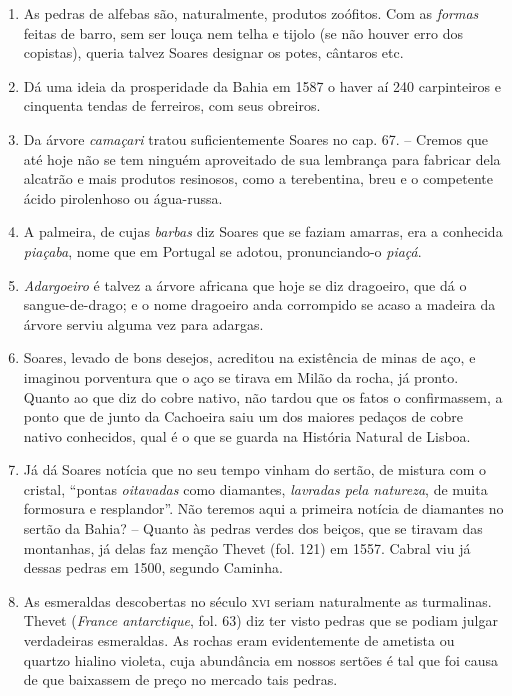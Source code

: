 \begin{enumerate}
\item As pedras de alfebas são, naturalmente, produtos zoófitos. Com as \textit{formas} 
feitas de barro, sem ser louça nem telha e tijolo (se não houver erro dos copistas), queria 
talvez Soares designar os potes, cântaros etc.

\item Dá uma ideia da prosperidade da Bahia em 1587 o haver aí 240 carpinteiros e cinquenta 
tendas de ferreiros, com seus obreiros.

\item Da árvore \textit{camaçari} tratou suficientemente Soares no cap. 67. -- Cremos que até 
hoje não se tem ninguém aproveitado de sua lembrança para fabricar dela alcatrão e 
mais produtos resinosos, como a terebentina, breu e o competente ácido pirolenhoso 
ou água-russa.

\item A palmeira, de cujas \textit{barbas} diz Soares que se faziam amarras, era a conhecida 
\textit{piaçaba}, nome que em Portugal se adotou, pronunciando-o \textit{piaçá}.

\item \textit{Adargoeiro} é talvez a árvore africana que hoje se diz dragoeiro, que dá o 
sangue-de-drago; e o nome dragoeiro anda corrompido se acaso a madeira da árvore serviu 
alguma vez para adargas.

\item Soares, levado de bons desejos, acreditou na existência de minas de aço, e 
imaginou porventura que o aço se tirava em Milão da rocha, já pronto.
Quanto ao que diz do cobre nativo, não tardou que os fatos o confirmassem, a ponto 
que de junto da Cachoeira saiu um dos maiores pedaços de cobre nativo conhecidos, qual é 
o que se guarda na História Natural de Lisboa.

\item  Já dá Soares notícia que no seu tempo vinham do sertão, de mistura 
com o cristal, ``pontas \textit{oitavadas} como diamantes, \textit{lavradas pela natureza},
de muita formosura e resplandor''. Não teremos aqui a primeira notícia de diamantes no sertão da Bahia? -- Quanto às 
pedras verdes dos beiços, que se tiravam das montanhas, já delas faz menção Thevet (fol. 
121) em 1557. Cabral viu já dessas pedras em 1500, segundo Caminha.

\item  As esmeraldas descobertas no século \textsc{xvi} seriam naturalmente as
turmalinas. Thevet (\textit{France antarctique}, fol. 63) diz ter visto pedras que
se podiam julgar verdadeiras esmeraldas.
As rochas eram evidentemente de ametista ou quartzo hialino violeta, cuja abundância 
em nossos sertões é tal que foi causa de que baixassem de preço no mercado tais pedras.


\end{enumerate}
